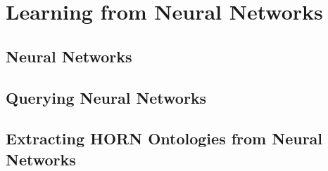 \chapter{Learning from Neural Networks}


\section{Neural Networks}

\section{Querying Neural Networks}

\section{Extracting HORN Ontologies from Neural Networks}